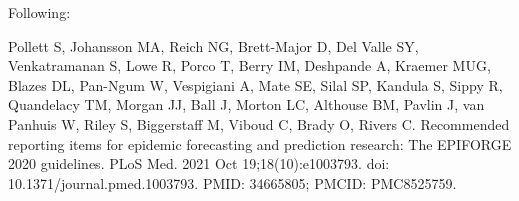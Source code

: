 \documentclass[
]{article}
\begin{document}
Following:

Pollett S, Johansson MA, Reich NG, Brett-Major D, Del Valle SY,
Venkatramanan S, Lowe R, Porco T, Berry IM, Deshpande A, Kraemer MUG,
Blazes DL, Pan-Ngum W, Vespigiani A, Mate SE, Silal SP, Kandula S, Sippy
R, Quandelacy TM, Morgan JJ, Ball J, Morton LC, Althouse BM, Pavlin J,
van Panhuis W, Riley S, Biggerstaff M, Viboud C, Brady O, Rivers C.
Recommended reporting items for epidemic forecasting and prediction
research: The EPIFORGE 2020 guidelines. PLoS Med. 2021 Oct
19;18(10):e1003793. doi: 10.1371/journal.pmed.1003793. PMID: 34665805;
PMCID: PMC8525759.
\end{document}
